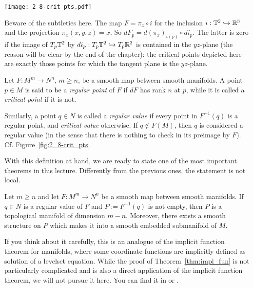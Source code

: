 \begin{marginfigure}
  \texttt{[image: 2\_8-crit\_pts.pdf]}
  \caption{Beware of the subtleties here. The map $F=\pi_x\circ i$ for the inclusion $i:\mathbb{T}^2\hookrightarrow\mathbb{R}^3$ and the projection $\pi_x(x,y,z)=x$.
    So $dF_p = d (\pi_x)_{i(p)} \circ d i_p$. The latter is zero if the image of $T_p\mathbb{T}^2$ by $d i_p: T_p\mathbb{T}^2\hookrightarrow T_p\mathbb{R}^3$ is contained in the $yz$-plane (the reason will be clear by the end of the chapter): the critical points depicted here are exactly those points for which the tangent plane is the $yz$-plane.}
  \label{fig:2_8-crit_pts}
\end{marginfigure}

\begin{definition}
  Let $F:M^m \to N^n$, $m\geq n$, be a smooth map between smooth manifolds.
  A point $p\in M$ is said to be a \emph{regular point} of $F$ if $dF$ has rank $n$ at $p$, while it is called a \emph{critical point} if it is not.

  Similarly, a point $q\in N$ is called a \emph{regular value} if every point in $F^{-1}(q)$ is a regular point, and \emph{critical value} otherwise. If $q\not\in F(M)$, then $q$ is considered a regular value (in the sense that there is nothing to check in its preimage by $F$).
  Cf. Figure~\ref{fig:2_8-crit_pts}.
\end{definition}

With this definition at hand, we are ready to state one of the most important theorems in this lecture.
Differently from the previous ones, the statement is not local.

\begin{theorem}\label{thm:impl_fun}
  Let $m\geq n$ and let $F: M^m \to N^n$ be a smooth map between smooth manifolds.
  If $q\in N$ is a regular value of $F$ and $P := F^{-1}(q)$ is not empty, then $P$ is a topological manifold of dimension $m-n$.
  Moreover, there exists a smooth structure on $P$ which makes it into a smooth embedded submanifold of $M$.
\end{theorem}

If you think about it carefully, this is an analogue of the implicit function theorem for manifolds, where some coordinate functions are implicitly defined as solution of a levelset equation.
While the proof of Theorem~\ref{thm:impl_fun} is not particularly complicated and is also a direct application of the implicit function theorem, we will not pursue it here. You can find it in \cite[Theorem 5.12]{book:lee} or \cite[Theorem 9.9]{book:tu}.

